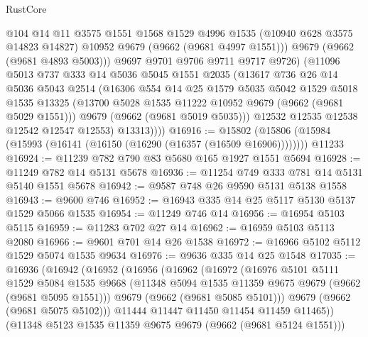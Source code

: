 \begin{lexlean}{RustCore}
\begin{coremodule}
                @104
                @14
                @11
                @3575
                @1551
                @1568
                @1529
                @4996
                @1535
                (@10940 @628 @3575 @14823 @14827)
                @10952
                @9679
                (@9662 (@9681 @4997 @1551)))
              @9679
              (@9662 (@9681 @4893 @5003)))
            @9697
            @9701
            @9706
            @9711
            @9717
            @9726)
          (@11096
            @5013
            @737
            @333
            @14
            @5036
            @5045
            @1551
            @2035
            (@13617
              @736
              @26
              @14
              @5036
              @5043
              @2514
              (@16306
                @554
                @14
                @25
                @1579
                @5035
                @5042
                @1529
                @5018
                @1535
                @13325
                (@13700 @5028 @1535 @11222 @10952 @9679 (@9662 (@9681 @5029 @1551)))
                @9679
                (@9662 (@9681 @5019 @5035)))
              @12532
              @12535
              @12538
              @12542
              @12547
              @12553)
            @13313))))
@16916 := @15802
    (@15806 (@15984 (@15993 (@16141 (@16150 (@16290 (@16357 (@16509 @16906))))))))
    @11233
@16924 := @11239 @782 @790 @83 @5680 @165 @1927 @1551 @5694
@16928 := @11249 @782 @14 @5131 @5678
@16936 := @11254 @749 @333 @781 @14 @5131 @5140 @1551 @5678
@16942 := @9587 @748 @26 @9590 @5131 @5138 @1558
@16943 := @9600 @746
@16952 := @16943 @335 @14 @25 @5117 @5130 @5137 @1529 @5066 @1535
@16954 := @11249 @746 @14
@16956 := @16954 @5103 @5115
@16959 := @11283 @702 @27 @14
@16962 := @16959 @5103 @5113 @2080
@16966 := @9601 @701 @14 @26 @1538
@16972 := @16966 @5102 @5112 @1529 @5074 @1535 @9634
@16976 := @9636 @335 @14 @25 @1548
@17035 := @16936
    (@16942
      (@16952
        (@16956
          (@16962
            (@16972
              (@16976
                @5101
                @5111
                @1529
                @5084
                @1535
                @9668
                (@11348 @5094 @1535 @11359 @9675 @9679 (@9662 (@9681 @5095 @1551)))
                @9679
                (@9662 (@9681 @5085 @5101)))
              @9679
              (@9662 (@9681 @5075 @5102)))
            @11444
            @11447
            @11450
            @11454
            @11459
            @11465))
        (@11348 @5123 @1535 @11359 @9675 @9679 (@9662 (@9681 @5124 @1551)))

\end{coremodule}
\end{lexlean}
